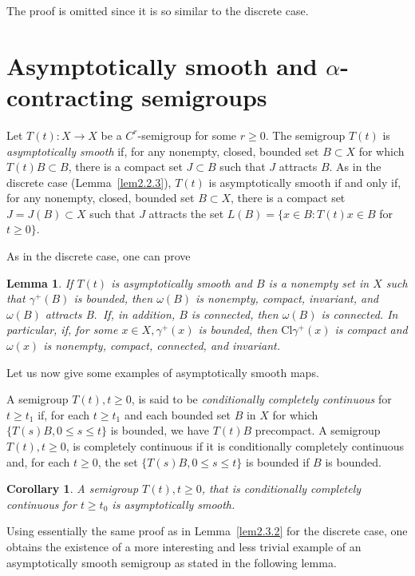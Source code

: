 \documentclass{surv-l}
\theoremstyle{plain}
\newtheorem{corollary}[theorem]{Corollary}
\newtheorem{lemma}[theorem]{Lemma}
\theoremstyle{definition}
\numberwithin{equation}{section}
\numberwithin{figure}{chapter}
\begin{document}
The proof is omitted since it is so similar to the discrete case.

\section{Asymptotically smooth and $\alpha$-contracting semigroups}\label{sec3.2}

Let $T(t)\!:X\rightarrow X$ be a $C^{r}$-semigroup for some $r\geq 0$. The semigroup $T(t)$ is \emph{asymptotically smooth} if, for any nonempty, closed, bounded set $B\subset X$ for which $T(t)B\subset B$, there is a compact set $J\subset B$ such that $J$ attracts $B$. As in the discrete case (Lemma~\ref{lem2.2.3}), $T(t)$ is asymptotically smooth if and only if, for any nonempty, closed, bounded set $B\subset X$, there is a compact set $J=J(B)\subset X$ such that $J$ attracts the set $L(B)=\{x\in B\!:T(t)x\in B$ for $t\geq 0\}$.

As in the discrete case, one can prove

\begin{lemma}\label{lem3.2.1} If $T(t)$ is asymptotically smooth and $B$ is a nonempty set in $X$ such that $\gamma^{+}(B)$ is bounded, then $\omega(B)$ is nonempty, compact, invariant, and $\omega(B)$ attracts B.\, If, in addition, $B$ is connected, then $\omega(B)$ is connected. In particular, if, for some $x\in X, \gamma^{+}(x)$ is bounded, then $\mathrm{Cl}\gamma^{+}(x)$ is compact and $\omega(x)$ is nonempty, compact, connected, and invariant.
\end{lemma}

Let us now give some examples of asymptotically smooth maps.

A semigroup $T(t), t\geq 0$, is said to be \emph{conditionally completely continuous} for $t\geq t_{1}$ if, for each $t\geq t_{1}$ and each bounded set $B$ in $X$ for which $\{T(s)B, 0\leq s\leq t\}$ is bounded, we have $T(t)B$ precompact. A semigroup $T(t), t\geq 0$, is completely continuous if it is conditionally completely continuous and, for each $t\geq 0$, the set $\{T(s)B, 0\leq s\leq t\}$ is bounded if $B$ is bounded.

\begin{corollary}\label{cor3.2.2} A semigroup $T(t), t\geq 0$, that is conditionally completely continuous for $t\geq t_{0}$ is asymptotically smooth.
\end{corollary}

Using essentially the same proof as in Lemma~\ref{lem2.3.2} for the discrete case, one obtains the existence of a more interesting and less trivial example of an asymptotically smooth semigroup as stated in the following lemma.
\end{document}
